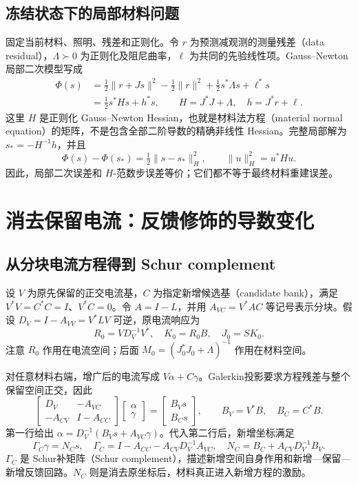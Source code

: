 \subsection{冻结状态下的局部材料问题}
固定当前材料、照明、残差和正则化。令 $r$ 为预测减观测的测量残差（data residual），$\Lambda\succ0$ 为正则化及阻尼曲率，$\ell$ 为共同的先验线性项。Gauss--Newton局部二次模型写成
\begin{equation}
 \begin{aligned}
 \Phi(s)&=\tfrac12\|r+Js\|^2-\tfrac12\|r\|^2
             +\tfrac12s^*\Lambda s+\ell^*s\\
 &=\tfrac12s^*Hs+h^*s,\qquad
 H=J^*J+\Lambda,\quad h=J^*r+\ell.
 \end{aligned}
\end{equation}
这里 $H$ 是正则化 Gauss--Newton Hessian，也就是材料法方程（material normal equation）的矩阵，不是包含全部二阶导数的精确非线性 Hessian。完整局部解为 $s_*=-H^{-1}h$，并且
\begin{equation}
 \Phi(s)-\Phi(s_*)=\tfrac12\|s-s_*\|_H^2,
 \qquad \|u\|_H^2=u^*Hu.
\end{equation}
因此，局部二次误差和 $H$-范数步误差等价；它们都不等于最终材料重建误差。

\section{消去保留电流：反馈修饰的导数变化}
\subsection{从分块电流方程得到 Schur complement}
设 $V$ 为原先保留的正交电流基，$C$ 为指定新增候选基（candidate bank），满足 $V^*V=C^*C=I$、$V^*C=0$。令 $A=I-L$，并用 $A_{VC}=V^*AC$ 等记号表示分块。假设 $D_V=I-A_{VV}=V^*LV$ 可逆，原电流响应为
\begin{equation}
 R_0=VD_V^{-1}V^*,\quad K_0=R_0B,\quad J_0=SK_0.
\end{equation}
注意 $R_0$ 作用在电流空间；后面 $M_0=(J_0^*J_0+\Lambda)^{-1}$ 作用在材料空间。

对任意材料右端，增广后的电流写成 $V\alpha+C\gamma$。Galerkin投影要求方程残差与整个保留空间正交，因此
\begin{equation}
 \begin{bmatrix}D_V&-A_{VC}\\-A_{CV}&I-A_{CC}\end{bmatrix}
 \begin{bmatrix}\alpha\\\gamma\end{bmatrix}
 =\begin{bmatrix}B_Vs\\B_Cs\end{bmatrix},
 \qquad B_V=V^*B,\quad B_C=C^*B.
\end{equation}
第一行给出 $\alpha=D_V^{-1}(B_Vs+A_{VC}\gamma)$。代入第二行后，新增坐标满足
\begin{equation}
 \Gamma_C\gamma=N_Cs,
 \quad\Gamma_C=I-A_{CC}-A_{CV}D_V^{-1}A_{VC},
 \quad N_C=B_C+A_{CV}D_V^{-1}B_V.
\end{equation}
$\Gamma_C$ 是 Schur补矩阵（Schur complement），描述新增空间自身作用和新增—保留—新增反馈回路。$N_C$ 则是消去原坐标后，材料真正进入新增方程的激励。

